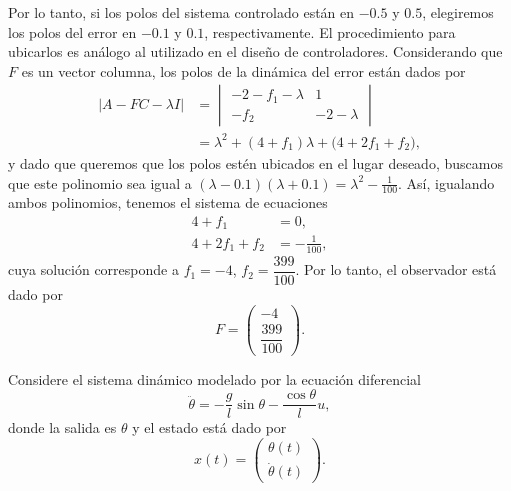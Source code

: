 \documentclass[
  11pt,
  letterpaper,
   addpoints,
  answers
  ]{exam}
\begin{document}
\begin{questions}
\begin{solution}
Por lo tanto, si los polos del sistema controlado están en $-0.5$ y $0.5$, elegiremos los polos del error en $-0.1$ y $0.1$, respectivamente. El procedimiento para ubicarlos es análogo al utilizado en el diseño de controladores. Considerando que $F$ es un vector columna, los polos de la dinámica del error están dados por
\begin{align}
\lvert A-FC-\lambda I\rvert
&=
\begin{vmatrix}
-2-f_{1}-\lambda & 1\\
-f_{2} & -2-\lambda
\end{vmatrix}\\
&=\lambda^{2}+(4+f_{1})\lambda+\big(4+2f_{1}+f_{2}\big),
\end{align}
y dado que queremos que los polos estén ubicados en el lugar deseado, buscamos que este polinomio sea igual a $(\lambda-0.1)(\lambda+0.1)=\lambda^{2}-\frac{1}{100}$. Así, igualando ambos polinomios, tenemos el sistema de ecuaciones
\begin{align}
4+f_{1}&=0,\\
4+2f_{1}+f_{2}&=-\frac{1}{100},
\end{align}
cuya solución corresponde a $f_{1}=-4$, $f_{2}=\dfrac{399}{100}$. Por lo tanto, el observador está dado por
\begin{equation}
F=\begin{pmatrix}-4\\[4pt] \dfrac{399}{100}\end{pmatrix}.
\end{equation}

\end{solution}
\question Considere el sistema dinámico modelado por la ecuación diferencial
\begin{equation}
    \ddot{\theta} = -\frac{g}{l} \sin \theta - \frac{\cos \theta}{l} u,
\end{equation}
donde la salida es $\theta$ y el estado está dado por
\begin{equation}
    x(t) = \begin{pmatrix} \theta(t) \\ \dot{\theta}(t) \end{pmatrix}.
\end{equation}


\end{questions}
\end{document}
